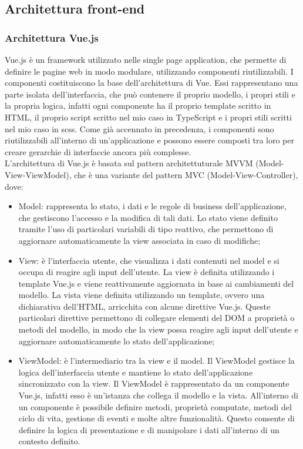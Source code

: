 \subsection{Architettura front-end}\label{subsec:architettura-front-end}
\subsubsection{Architettura Vue.js}\label{subsubsec:architettura-vue.js}
Vue.js è un framework utilizzato nelle single page application, che permette di definire le pagine web in modo modulare, utilizzando componenti riutilizzabili.
I componenti costituiscono la base dell'architettura di Vue. Essi rappresentano una parte isolata dell'interfaccia, che può contenere il proprio modello, i propri stili e la propria logica, infatti ogni componente ha il proprio
template scritto in HTML, il proprio script scritto nel mio caso in TypeScript e i propri stili scritti nel mio caso in scss.
Come già accennato in precedenza, i componenti sono riutilizzabili all'interno di un'applicazione e possono essere composti tra loro per creare gerarchie di interfaccie ancora più complesse.\\

L'architettura di Vue.js è basata sul pattern architettuturale MVVM (Model-View-ViewModel), che è una variante del pattern MVC (Model-View-Controller), dove:
\begin{itemize}
  \item Model: rappresenta lo stato, i dati e le regole di business dell'applicazione, che gestiscono l'accesso e la modifica di tali dati. Lo stato viene definito tramite l'uso
  di particolari variabili di tipo reattivo, che permettono di aggiornare automaticamente la view associata in caso di modifiche;
  \item View: è l'interfaccia utente, che visualizza i dati contenuti nel model e si occupa di reagire agli input dell'utente. La view è definita utilizzando i template Vue.js e viene reattivamente aggiornata in base ai cambiamenti del modello. La vista viene definita utilizzando un template, ovvero una dichiarativa dell'HTML, arricchita con alcune direttive Vue.js. 
  Queste particolari direttive permettono di collegare elementi del DOM a proprietà o metodi del modello, in modo che la view possa reagire agli input dell'utente e aggiornare automaticamente lo stato dell'applicazione;
  \item ViewModel: è l'intermediario tra la view e  il model. Il ViewModel gestisce la logica dell'interfaccia utente e mantiene lo stato dell'applicazione sincronizzato con la view.
  Il ViewModel è rappresentato da un componente Vue.js, infatti esso è un'istanza che collega il modello e la vista. All'interno di un componente è possibile definire metodi, proprietà 
  computate, metodi del ciclo di vita, gestione di eventi e molte altre funzionalità. Questo consente di definire la logica di presentazione e di manipolare i dati all'interno di un contesto definito.
\end{itemize}

